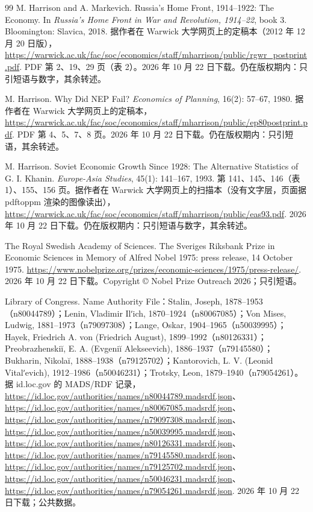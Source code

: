 \begin{thebibliography}{99}
 M. Harrison and A. Markevich. Russia's Home Front, 1914--1922: The Economy. In \emph{Russia's Home Front in War and Revolution, 1914--22}, book 3. Bloomington: Slavica, 2018. 据作者在 Warwick 大学网页上的定稿本（2012 年 12 月 20 日版），\url{https://warwick.ac.uk/fac/soc/economics/staff/mharrison/public/rgwr_postprint.pdf}. PDF 第 2、19、29 页（表 2）。2026 年 10 月 22 日下载。仍在版权期内：只引短语与数字，其余转述。

 M. Harrison. Why Did NEP Fail? \emph{Economics of Planning}, 16(2): 57--67, 1980. 据作者在 Warwick 大学网页上的定稿本，\url{https://warwick.ac.uk/fac/soc/economics/staff/mharrison/public/ep80postprint.pdf}. PDF 第 4、5、7、8 页。2026 年 10 月 22 日下载。仍在版权期内：只引短语，其余转述。

 M. Harrison. Soviet Economic Growth Since 1928: The Alternative Statistics of G. I. Khanin. \emph{Europe-Asia Studies}, 45(1): 141--167, 1993. 第 141、145、146（表 1）、155、156 页。据作者在 Warwick 大学网页上的扫描本（没有文字层，页面据 pdftoppm 渲染的图像读出），\url{https://warwick.ac.uk/fac/soc/economics/staff/mharrison/public/eas93.pdf}. 2026 年 10 月 22 日下载。仍在版权期内：只引短语与数字，其余转述。

 The Royal Swedish Academy of Sciences. The Sveriges Riksbank Prize in Economic Sciences in Memory of Alfred Nobel 1975: press release, 14 October 1975. \url{https://www.nobelprize.org/prizes/economic-sciences/1975/press-release/}. 2026 年 10 月 22 日下载。Copyright © Nobel Prize Outreach 2026；只引短语。

 Library of Congress. Name Authority File：Stalin, Joseph, 1878--1953（n80044789）；Lenin, Vladimir Ilʹich, 1870--1924（n80067085）；Von Mises, Ludwig, 1881--1973（n79097308）；Lange, Oskar, 1904--1965（n50039995）；Hayek, Friedrich A. von (Friedrich August), 1899--1992（n80126331）；Preobrazhenskiĭ, E. A. (Evgeniĭ Alekseevich), 1886--1937（n79145580）；Bukharin, Nikolaĭ, 1888--1938（n79125702）；Kantorovich, L. V. (Leonid Vitalʹevich), 1912--1986（n50046231）；Trotsky, Leon, 1879--1940（n79054261）。据 id.loc.gov 的 MADS/RDF 记录，\url{https://id.loc.gov/authorities/names/n80044789.madsrdf.json}、\url{https://id.loc.gov/authorities/names/n80067085.madsrdf.json}、\url{https://id.loc.gov/authorities/names/n79097308.madsrdf.json}、\url{https://id.loc.gov/authorities/names/n50039995.madsrdf.json}、\url{https://id.loc.gov/authorities/names/n80126331.madsrdf.json}、\url{https://id.loc.gov/authorities/names/n79145580.madsrdf.json}、\url{https://id.loc.gov/authorities/names/n79125702.madsrdf.json}、\url{https://id.loc.gov/authorities/names/n50046231.madsrdf.json}、\url{https://id.loc.gov/authorities/names/n79054261.madsrdf.json}. 2026 年 10 月 22 日下载；公共数据。


\end{thebibliography}
